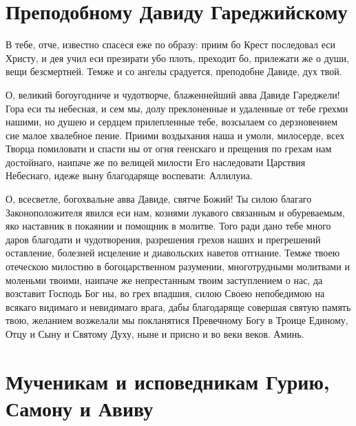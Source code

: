 \section{Преподобному Давиду Гареджийскому}
 




В тебе, отче, известно спасеся еже по образу: приим бо Крест последовал еси Христу, и дея учил еси презирати убо плоть, преходит бо, прилежати же о души, вещи безсмертней. Темже и со ангелы срадуется, преподобне Давиде, дух твой.




О, великий богоугодниче и чудотворче, блаженнейший авва Давиде Гареджели! Гора еси ты небесная, и сем мы, долу преклоненные и удаленные от тебе грехми нашими, но душею и сердцем прилепленные тебе, возсылаем со дерзновением сие малое хвалебное пение. Приими воздыхания наша и умоли, милосерде, всех Творца помиловати и спасти ны от огня геенскаго и прещения по грехам нам достойнаго, наипаче же по велицей милости Его наследовати Царствия Небеснаго, идеже выну благодаряще воспевати: Аллилуиа.




О, всесветле, богохвальне авва Давиде, святче Божий! Ты силою благаго Законоположителя явился еси нам, кознями лукавого связанным и обуреваемым, яко наставник в покаянии и помощник в молитве. Того ради дано тебе много даров благодати и чудотворения, разрешения грехов наших и прегрешений оставление, болезней исцеление и диавольских наветов отгнание. Темже твоею отеческою милостию в богоцарственном разумении, многотрудными молитвами и моленьми твоими, наипаче же непрестанным твоим заступлением о нас, да возставит Господь Бог ны, во грех впадшия, силою Своею непобедимою на всякаго видимаго и невидимаго врага, дабы благодаряще совершая святую память твою, желанием возжелали мы покланятися Превечному Богу в Троице Единому, Отцу и Сыну и Святому Духу, ныне и присно и во веки веков. Аминь.
\mychapterending


 

\section{Мученикам и исповедникам Гурию, Самону и Авиву}
 


